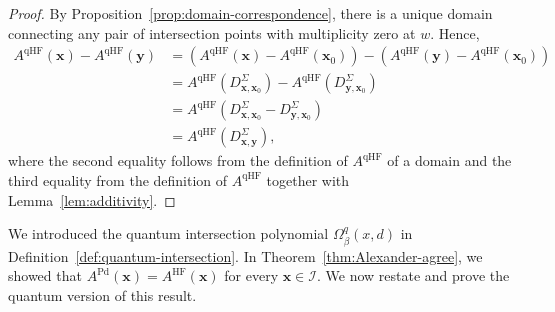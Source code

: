 \documentclass[11pt]{amsart}
\numberwithin{equation}{section}
\numberwithin{figure}{section}
\theoremstyle{definition}
\newcommand{\cI}{\mathcal{I}}
\DeclareMathOperator{\qHF}{qHF}
\DeclareMathOperator{\HF}{HF}
\DeclareMathOperator{\Pd}{Pd}
\newcommand{\xs}{\boldsymbol{x}}
\newcommand{\ys}{\boldsymbol{y}}
\begin{document}
\begin{proof}
    By Proposition~\ref{prop:domain-correspondence}, there is a unique domain connecting any pair of intersection points with multiplicity zero at $w$. Hence,
    \[
    \begin{split}
    A^{\qHF}(\xs) - A^{\qHF}(\ys) &= \left(A^{\qHF}(\xs) - A^{\qHF}(\xs_0)\right) - \left(A^{\qHF}(\ys) - A^{\qHF}(\xs_0)\right) \\
    &= A^{\qHF}\left(D^\Sigma_{\xs,\xs_0}\right) - A^{\qHF}\left(D^\Sigma_{\ys,\xs_0}\right) \\
    &= A^{\qHF}\left(D^\Sigma_{\xs,\xs_0} - D^\Sigma_{\ys,\xs_0}\right) \\
    &= A^{\qHF}\left(D^\Sigma_{\xs,\ys}\right),
    \end{split}
    \]
    where the second equality follows from the definition of $A^{\qHF}$ of a domain and the third equality from the definition of $A^{\qHF}$ together with Lemma~\ref{lem:additivity}.
\end{proof}

We introduced the quantum intersection polynomial $\Omega^q_\beta(x,d)$ in Definition~\ref{def:quantum-intersection}. In Theorem~\ref{thm:Alexander-agree}, we showed that $A^{\Pd}(\xs) = A^{\HF}(\xs)$ for every $\xs \in \cI$. We now restate and prove the quantum version of this result.

\thmidqgr*
\end{document}
